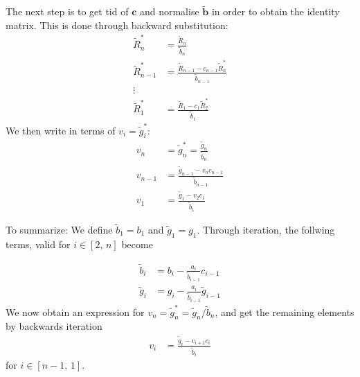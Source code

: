 \documentclass[english,notitlepage,nofootinbib]{revtex4-1}  %
\renewcommand{\vec}{\mathbf}
\begin{document}
The next step is to get tid of $\vec{ c}$ and normalise $\vec{\tilde{b}}$ in order to obtain the identity matrix. This is done through backward substitution:
\begin{align*} 
    \tilde{R}^*_n &= \frac{\tilde{R}_n}{\tilde{b}_n} \\
    \tilde{R}^*_{n-1} &= \frac{\tilde{R}_{n-1} -  c_{n-1}\tilde{R}^*_n}{\tilde{b}_{n-1}} \\
    \vdots & \\
    \tilde{R}^*_1 &= \frac{\tilde{R}_{1} -  c_{1}\tilde{R}^*_2}{\tilde{b}_{1}}
\end{align*}
We then write in terms of $v_i = \tilde{g}^*_i$:
\begin{align*}
    v_n &= \tilde{g}^*_n = \frac{\tilde{g}_n}{\tilde{b}_n} \\
    v_{n-1} &= \frac{\tilde{g}_{n-1}- v_n c_{n-1}}{\tilde{b}_{n-1}}\\
    v_1 &= \frac{\tilde{g}_1 - v_2 c_1}{\tilde{b}_1}
\end{align*}


To summarize: We define $\tilde{b}_1 = b_1$ and $\tilde{g}_1 = g_1$. Through iteration, the follwing terms, valid for $i\in[2,\,n]$ become 

\begin{align*}
    \tilde{b}_i &= b_i - \frac{a_i}{\tilde{b}_{i-1}} c_{i-1} \\
    \tilde{g}_i &= g_i - \frac{a_i}{\tilde{b}_{i-1}}\tilde{g}_{i-1} 
\end{align*}
We now obtain an expression for $v_n=\tilde{g}^*_n = \tilde{g}_n/\tilde{b}_n$, and get the remaining elements by backwards iteration  
\begin{align*}
    v_{i} &= \frac{\tilde{g}_{i}- v_{i+1} c_{i}}{\tilde{b}_{i}} 
\end{align*}
for $i\in[n-1,\,1]$. 
\end{document}
